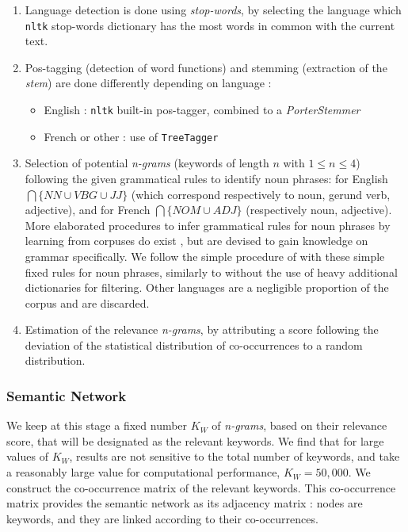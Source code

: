 \documentclass[10pt]{article}
\begin{document}
\begin{enumerate}
\item Language detection is done using \textit{stop-words}, by selecting the language which \texttt{nltk} stop-words dictionary has the most words in common with the current text.
\item Pos-tagging (detection of word functions) and stemming (extraction of the \emph{stem}) are done differently depending on language :
\begin{itemize}
\item English : \texttt{nltk} built-in pos-tagger, combined to a \emph{PorterStemmer}
\item French or other : use of \texttt{TreeTagger}~\citep{schmid1994probabilistic}
\end{itemize}
\item Selection of potential \textit{n-grams} (keywords of length $n$ with $1 \leq n \leq 4$) following the given grammatical rules to identify noun phrases: for English $\bigcap \{NN \cup VBG \cup JJ \}$ (which correspond respectively to noun, gerund verb, adjective), and for French $\bigcap \{NOM \cup ADJ\}$ (respectively noun, adjective). More elaborated procedures to infer grammatical rules for noun phrases by learning from corpuses do exist \citep{cardie1998error}, but are devised to gain knowledge on grammar specifically. We follow the simple procedure of \cite{chavalarias2013phylomemetic} with these simple fixed rules for noun phrases, similarly to \cite{kumar2008automatic} without the use of heavy additional dictionaries for filtering. Other languages are a negligible proportion of the corpus and are discarded.
\item Estimation of the relevance \textit{n-grams}, by attributing a score following the deviation of the statistical distribution of co-occurrences to a random distribution.
\end{enumerate}



\subsubsection*{Semantic Network}

We keep at this stage a fixed number $K_W$ of \textit{n-grams}, based on their relevance score, that will be designated as the relevant keywords. We find that for large values of $K_W$, results are not sensitive to the total number of keywords, and take a reasonably large value for computational performance, $K_W = 50,000$. We construct the co-occurrence matrix of the relevant keywords. This co-occurrence matrix provides the semantic network as its adjacency matrix : nodes are keywords, and they are linked according to their co-occurrences.
\end{document}
